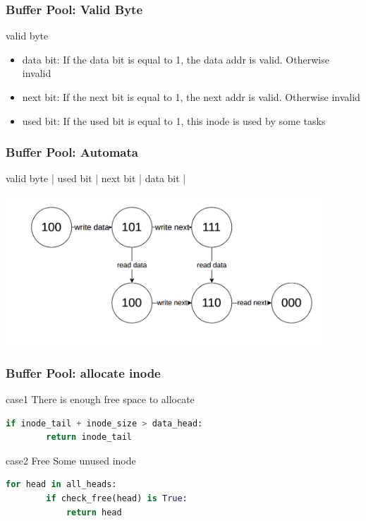 \documentclass[notheorems, aspectratio=54]{beamer}
\begin{document}
\begin{frame}
    \frametitle{Buffer Pool: Valid Byte}
    \begin{block} {valid byte}
        \begin{itemize}
            \item data bit: If the data bit is equal to 1, the data addr is valid. Otherwise invalid
            \item next bit: If the next bit is equal to 1, the next addr is valid. Otherwise invalid
            \item used bit: If the used bit is equal to 1, this inode is used by some tasks
        \end{itemize}
    \end{block}
\end{frame}

\begin{frame}
    \frametitle{Buffer Pool: Automata}
    \begin{block} {valid byte}
        | used bit | next bit | data bit |
    \end{block}
    \centering
    \includegraphics[width=12cm]{global_img_dir/automata.png}
\end{frame}


\begin{frame}[fragile]
    \frametitle{Buffer Pool: allocate inode}
    
        \begin{block} {case1}
            There is enough free space to allocate
        \end{block}
        \begin{lstlisting}[language=python]
    if inode_tail + inode_size > data_head:
        return inode_tail
        \end{lstlisting}

        \begin{block} {case2}
            Free Some unused inode
        \end{block}
        \begin{lstlisting}[language=python]
    for head in all_heads:
        if check_free(head) is True:
            return head
        \end{lstlisting}
        
\end{frame}
\end{document}
